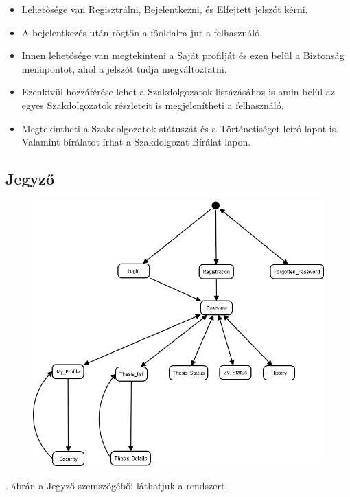 \documentclass[a4paper,12pt]{article}
\begin{document}
\begin{itemize}
	\item Lehetősége van Regisztrálni, Bejelentkezni, és Elfejtett jelszót kérni. 
	\item A bejelentkezés után rögtön a főoldalra jut a felhasználó. 
	\item Innen lehetősége van megtekinteni a Saját profilját és ezen belül a Biztonság menüpontot, ahol a jelszót tudja megváltoztatni. 
	\item Ezenkívül hozzáférése lehet a Szakdolgozatok listázásához is amin belül az egyes Szakdolgozatok részleteit is megjelenítheti a felhasználó. 
	\item Megtekintheti a Szakdolgozatok státuszát és a Történetiséget leíró lapot is. Valamint bírálatot írhat a Szakdolgozat Bírálat lapon. 
\end{itemize}

\subsection{Jegyző}

\begin{figure}
	\centering
	\includegraphics[width=\textwidth]{images/Lapok_kozotti_atmenetek/Jegyzo.png}
	\caption{}
	\label{fig:Jegyzo}
\end{figure}

. ábrán a Jegyző szemszögéből láthatjuk a rendszert. 
\end{document}
